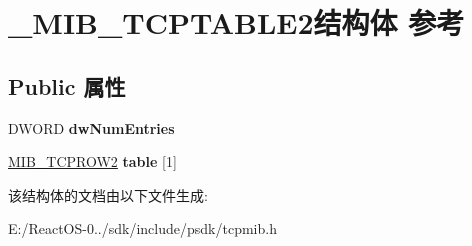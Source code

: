 \hypertarget{struct___m_i_b___t_c_p_t_a_b_l_e2}{}\section{\+\_\+\+M\+I\+B\+\_\+\+T\+C\+P\+T\+A\+B\+L\+E2结构体 参考}
\label{struct___m_i_b___t_c_p_t_a_b_l_e2}
\subsection*{Public 属性}
\begin{DoxyCompactItemize}
\item 
\mbox{\label{struct___m_i_b___t_c_p_t_a_b_l_e2_acd43f2ef53033952e2b7cfbbc18eb737}} 
D\+W\+O\+RD {\bfseries dw\+Num\+Entries}
\item 
\mbox{\label{struct___m_i_b___t_c_p_t_a_b_l_e2_af87a301e4ca720000e6a158aa34e0d5a}} 
\hyperlink{struct___m_i_b___t_c_p_r_o_w2}{M\+I\+B\+\_\+\+T\+C\+P\+R\+O\+W2} {\bfseries table} \mbox{[}1\mbox{]}
\end{DoxyCompactItemize}


该结构体的文档由以下文件生成\+:\begin{DoxyCompactItemize}
\item 
E\+:/\+React\+O\+S-\/0../sdk/include/psdk/tcpmib.\+h\end{DoxyCompactItemize}
